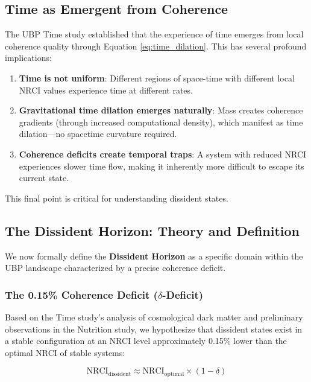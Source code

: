 \documentclass[12pt, a4paper]{article}
\begin{document}
\subsection{Time as Emergent from Coherence}

The UBP Time study established that the experience of time emerges from local coherence quality through Equation \ref{eq:time_dilation}. This has several profound implications:

\begin{enumerate}
    \item \textbf{Time is not uniform}: Different regions of space-time with different local NRCI values experience time at different rates.
    
    \item \textbf{Gravitational time dilation emerges naturally}: Mass creates coherence gradients (through increased computational density), which manifest as time dilation—no spacetime curvature required.
    
    \item \textbf{Coherence deficits create temporal traps}: A system with reduced NRCI experiences slower time flow, making it inherently more difficult to escape its current state.
\end{enumerate}

This final point is critical for understanding dissident states.

\subsection{The Dissident Horizon: Theory and Definition}

We now formally define the \textbf{Dissident Horizon} as a specific domain within the UBP landscape characterized by a precise coherence deficit.

\subsubsection{The 0.15\% Coherence Deficit ($\delta$-Deficit)}

Based on the Time study's analysis of cosmological dark matter and preliminary observations in the Nutrition study, we hypothesize that dissident states exist in a stable configuration at an NRCI level approximately 0.15\% lower than the optimal NRCI of stable systems:

\begin{equation}
\text{NRCI}_{\text{dissident}} \approx \text{NRCI}_{\text{optimal}} \times (1 - \delta)
\end{equation}
\end{document}
